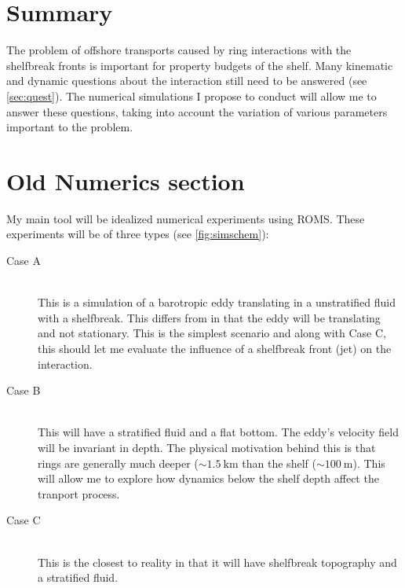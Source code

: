 \section{Summary}

The problem of offshore transports caused by ring interactions with the shelfbreak fronts is important for property budgets of the shelf. Many kinematic and dynamic questions about the interaction still need to be answered (see \cref{sec:quest}). The numerical simulations I propose to conduct will allow me to answer these questions, taking into account the variation of various parameters important to the problem. 


{}

 

\section{Old Numerics section}
My main tool will be idealized numerical experiments using ROMS. These experiments will be of three types (see \cref{fig:simschem}): 
\begin{description}
\item[Case A] \hfill \\ This is a simulation of a barotropic eddy translating in a unstratified fluid with a shelfbreak. This differs from \cite{Wang1992} in that the eddy will be translating and not stationary. This is the simplest scenario and along with Case C, this should let me evaluate the influence of a shelfbreak front (jet) on the interaction.

\item[Case B] \hfill \\ This will have a stratified fluid and a flat bottom. The eddy’s velocity field will be invariant in depth. The physical motivation behind this is that rings are generally much deeper ($\sim\SI{1.5}{\km}$ than the shelf ($\sim\SI{100}{\m}$). This will allow me to explore how dynamics below the shelf depth affect the tranport process.

\item[Case C] \hfill \\This is the closest to reality in that it will have shelfbreak topography and a stratified fluid. 
\end{description}

